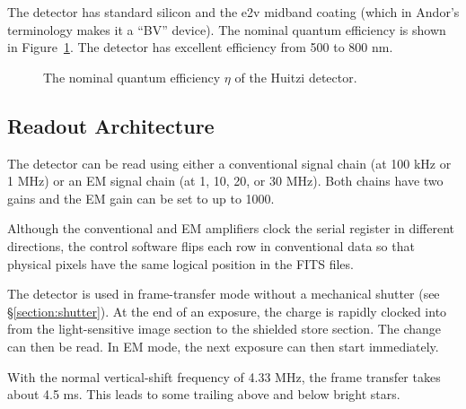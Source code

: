 The detector has standard silicon and the e2v midband coating (which in Andor's terminology makes it a “BV” device). The nominal quantum efficiency is shown in Figure~\ref{figure:detector-quantum-efficiency}. The detector has excellent efficiency from 500 to 800 nm.

\begin{figure}
\begin{center}
\end{center}
\caption{The nominal quantum efficiency $\eta$ of the Huitzi detector.}
\label{figure:detector-quantum-efficiency}
\end{figure}

\subsection{Readout Architecture}

The detector can be read using either a conventional signal chain (at 100 kHz or 1 MHz) or an EM signal chain (at 1, 10, 20, or 30 MHz). Both chains have two gains and the EM gain can be set to up to 1000. 

Although the conventional and EM amplifiers clock the serial register in different directions, the control software flips each row in conventional data so that physical pixels have the same logical position in the FITS files.

The detector is used in frame-transfer mode without a mechanical shutter (see \S\ref{section:shutter}). At the end of an exposure, the charge is rapidly clocked into from the light-sensitive image section to the shielded store section. The change can then be read. In EM mode, the next exposure can then start immediately.

With the normal vertical-shift frequency of 4.33 MHz, the frame transfer takes about 4.5 ms. This leads to some trailing above and below bright stars.


